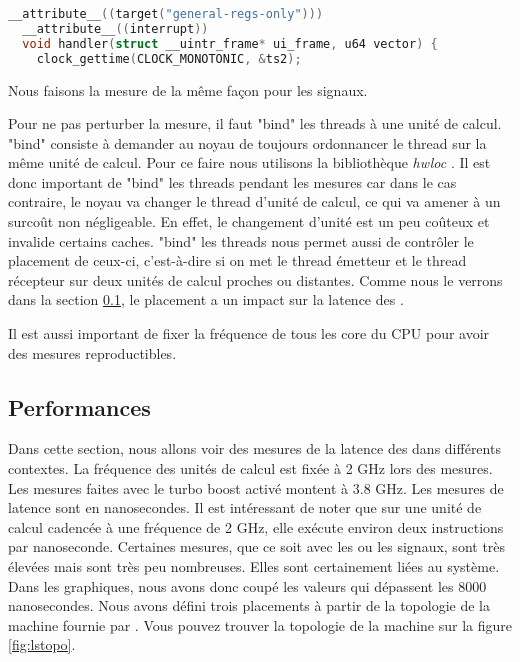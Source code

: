 
\begin{lstlisting}[language=c, caption=Déclaration du handler \uintr{}, label={lst:unitrHandler}]
  __attribute__((target("general-regs-only")))
  __attribute__((interrupt))
  void handler(struct __uintr_frame* ui_frame, u64 vector) {
    clock_gettime(CLOCK_MONOTONIC, &ts2);
\end{lstlisting}


Nous faisons la mesure de la même façon pour les signaux.

Pour ne pas perturber la mesure, il faut "bind" les threads à une unité de calcul.
"bind" consiste à demander au noyau de toujours ordonnancer le thread sur la même unité de calcul.
Pour ce faire nous utilisons la bibliothèque \emph{hwloc} \cite{hwloc}.
Il est donc important de "bind" les threads pendant les mesures car dans le cas contraire,
le noyau va changer le thread d'unité de calcul, ce qui va amener à un surcoût non négligeable.
En effet, le changement d'unité est un peu coûteux et invalide certains caches.
"bind" les threads nous permet aussi de contrôler le placement de ceux-ci, c'est-à-dire si on met le thread émetteur et le thread récepteur sur deux unités de calcul proches ou distantes.
Comme nous le verrons dans la section \ref{sec:performance}, le placement a un impact sur la latence des \uintr{}.

Il est aussi important de fixer la fréquence de tous les core du CPU pour avoir des mesures reproductibles.

\subsection{Performances}
\label{sec:performance}

Dans cette section, nous allons voir des mesures de la latence des \uintr{} dans différents contextes.
La fréquence des unités de calcul est fixée à 2 GHz lors des mesures.
Les mesures faites avec le turbo boost activé montent à 3.8 GHz.
Les mesures de latence sont en nanosecondes.
Il est intéressant de noter que sur une unité de calcul cadencée à une fréquence de 2 GHz, elle exécute environ deux instructions par nanoseconde. %
Certaines mesures, que ce soit avec les \uintr{} ou les signaux, sont très élevées mais sont très peu nombreuses.
Elles sont certainement liées au système.
Dans les graphiques, nous avons donc coupé les valeurs qui dépassent les 8000 nanosecondes. %
Nous avons défini trois placements à partir de la topologie de la machine fournie par \atos{}.
Vous pouvez trouver la topologie de la machine sur la figure \ref{fig:lstopo}.

